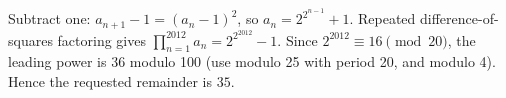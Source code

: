 Subtract one: $a_{n+1}-1=(a_n-1)^2$, so $a_n=2^{2^{n-1}}+1$. Repeated difference-of-squares factoring gives $\prod_{n=1}^{2012}a_n=2^{2^{2012}}-1$. Since $2^{2012}\equiv16\pmod{20}$, the leading power is 36 modulo 100 (use modulo 25 with period 20, and modulo 4). Hence the requested remainder is $\boxed{35}$.
